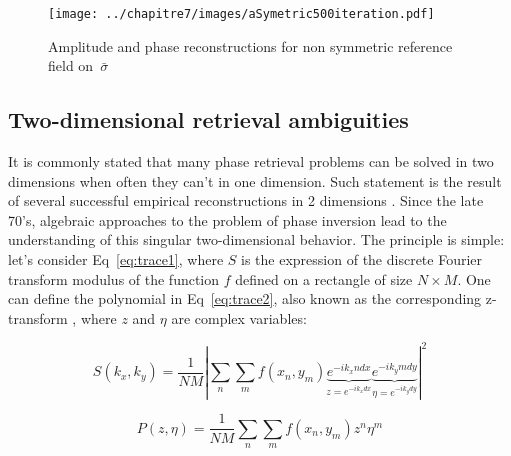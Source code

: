  \begin{figure}[H]
\centering
\texttt{[image: ../chapitre7/images/aSymetric500iteration.pdf]}\\
\caption{\label{fig:aSymetric500iteration} Amplitude and phase reconstructions for non symmetric reference field on~$\bar{\sigma}$}
\end{figure}

\newpage

\subsection{Two-dimensional retrieval ambiguities}

It is commonly stated that many phase retrieval problems can be solved in two dimensions when often they can't in one dimension. Such statement is the result of several successful empirical reconstructions in 2 dimensions \cite{fienup1987phase,fienup1984diffraction,napier1974inferring}. Since the late 70's, algebraic  approaches to the problem of phase inversion \cite{rosenblatt1984phase,barakat1984necessary} lead to the understanding of this singular two-dimensional behavior. The principle is simple: let's consider Eq~\ref{eq:trace1}, where $S$ is the expression of the discrete Fourier transform modulus of the function $f$ defined on a rectangle of size $N\times M$. One can define the polynomial in Eq~\ref{eq:trace2}, also known as the corresponding z-transform \cite{dudgeon1975existence}, where $z$ and $\eta $ are complex variables:



\begin{equation}
\label{eq:trace1}
S(k_x,k_y) = \frac{1}{NM}|\sum_{n}\sum_{m}f(x_n,y_m)\underbrace{e^{-i k_x ndx}}_{z=e^{-i k_x dx}}\underbrace{e^{-i k_y m dy }}_{\eta = e^{-i k_ydy }}|^2
\end{equation}

\begin{equation}
\label{eq:trace2}
P(z,\eta) = \frac{1}{NM}\sum_{n}\sum_{m}f(x_n,y_m)z^n \eta^m
\end{equation}

